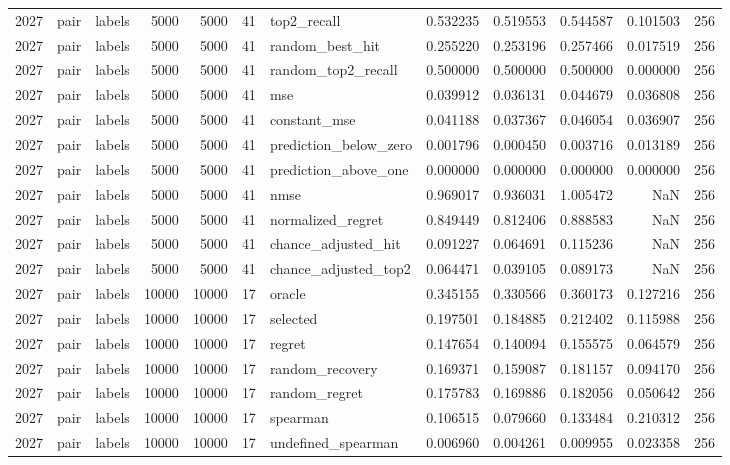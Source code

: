 \begin{tabular}{rllrrrlrrrrr}
2027 & pair & labels & 5000 & 5000 & 41 & top2_recall & 0.532235 & 0.519553 & 0.544587 & 0.101503 & 256 \\
2027 & pair & labels & 5000 & 5000 & 41 & random_best_hit & 0.255220 & 0.253196 & 0.257466 & 0.017519 & 256 \\
2027 & pair & labels & 5000 & 5000 & 41 & random_top2_recall & 0.500000 & 0.500000 & 0.500000 & 0.000000 & 256 \\
2027 & pair & labels & 5000 & 5000 & 41 & mse & 0.039912 & 0.036131 & 0.044679 & 0.036808 & 256 \\
2027 & pair & labels & 5000 & 5000 & 41 & constant_mse & 0.041188 & 0.037367 & 0.046054 & 0.036907 & 256 \\
2027 & pair & labels & 5000 & 5000 & 41 & prediction_below_zero & 0.001796 & 0.000450 & 0.003716 & 0.013189 & 256 \\
2027 & pair & labels & 5000 & 5000 & 41 & prediction_above_one & 0.000000 & 0.000000 & 0.000000 & 0.000000 & 256 \\
2027 & pair & labels & 5000 & 5000 & 41 & nmse & 0.969017 & 0.936031 & 1.005472 & NaN & 256 \\
2027 & pair & labels & 5000 & 5000 & 41 & normalized_regret & 0.849449 & 0.812406 & 0.888583 & NaN & 256 \\
2027 & pair & labels & 5000 & 5000 & 41 & chance_adjusted_hit & 0.091227 & 0.064691 & 0.115236 & NaN & 256 \\
2027 & pair & labels & 5000 & 5000 & 41 & chance_adjusted_top2 & 0.064471 & 0.039105 & 0.089173 & NaN & 256 \\
2027 & pair & labels & 10000 & 10000 & 17 & oracle & 0.345155 & 0.330566 & 0.360173 & 0.127216 & 256 \\
2027 & pair & labels & 10000 & 10000 & 17 & selected & 0.197501 & 0.184885 & 0.212402 & 0.115988 & 256 \\
2027 & pair & labels & 10000 & 10000 & 17 & regret & 0.147654 & 0.140094 & 0.155575 & 0.064579 & 256 \\
2027 & pair & labels & 10000 & 10000 & 17 & random_recovery & 0.169371 & 0.159087 & 0.181157 & 0.094170 & 256 \\
2027 & pair & labels & 10000 & 10000 & 17 & random_regret & 0.175783 & 0.169886 & 0.182056 & 0.050642 & 256 \\
2027 & pair & labels & 10000 & 10000 & 17 & spearman & 0.106515 & 0.079660 & 0.133484 & 0.210312 & 256 \\
2027 & pair & labels & 10000 & 10000 & 17 & undefined_spearman & 0.006960 & 0.004261 & 0.009955 & 0.023358 & 256 \\

\end{tabular}
